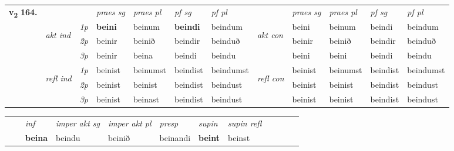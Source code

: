 \begin{tabular}{llllllllllll} \toprule
\multirow{4}{*}{{{\textbf{v{\textsubscript{2}}} \Large{\textbf{164.}}}}}  & &   &  \textit{praes sg}  & \textit{praes pl}  &\textit{ pf sg} & \textit{pf pl} &  &  \textit{praes sg}  & \textit{praes pl}  & \textit{pf sg} & \textit{pf pl } \\*
	\cmidrule{4-7} \cmidrule{9-12}
 & \multirow{3}{*}{\begin{turn}{90}\textit{akt ind}\end{turn}} & {\textit{1p}} & \textbf{beini} & beinum    & \textbf{beindi} & beindum & \multirow{3}{*}{\begin{turn}{90}\textit{akt con}\end{turn}} &beini & beinum & beindi & beindum\\*
& &  {\textit{2p}} &  beinir  & beinið   & beindir & beinduð & & beinir & beinið & beindir & beinduð \\*
& &  {\textit{3p}} & beinir & beina   & beindi & beindu & & beini & beini& beindi & beindu  \\*
\cmidrule{4-7} \cmidrule{9-12}
 &\multirow{3}{*}{\begin{turn}{90}\textit{refl ind}\end{turn}} & {\textit{1p}} & beinist & beinumst    & beindist & beindumst & \multirow{3}{*}{\begin{turn}{90}\textit{refl con}\end{turn}}  &beinist & beinumst & beindist & beindumst\\*
 &&  {\textit{2p}} &  beinist  & beinist   & beindist & beindust & &beinist & beinist & beindist & beindust \\*
& &  {\textit{3p}} & beinist & beinast   & beindist & beindust & & beinist & beinist& beindist & beindust  \\*
\cmidrule{4-7} \cmidrule{9-12}
\end{tabular}


\begin{tabular}{llllllllllll}
 & & \textit{inf} & \textit{imper akt sg} & \textit{imper akt pl}   & \textit{presp} & \textit{supin} & \textit{supin refl}      \\*
  & & \textbf{beina} & beindu  & beinið   & beinandi &  \textbf{beint} & beinst  \\*
\cmidrule{1-12}
\end{tabular}



